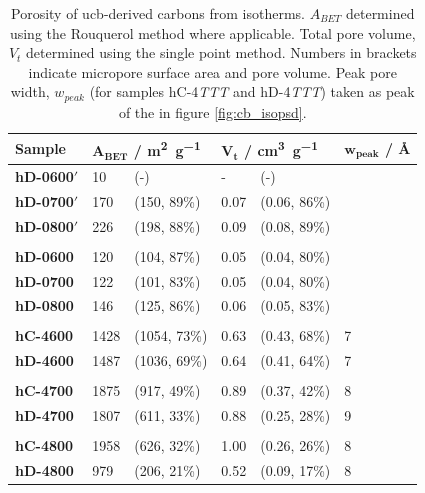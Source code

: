\begin{table}[hb!]
    \centering
    \caption{Porosity of \acrshort{ucb}-derived carbons from  isotherms. $A_{BET}$ determined using the Rouquerol method where applicable. Total pore volume, $V_t$ determined using the single point method. Numbers in brackets indicate micropore surface area and pore volume. Peak pore width, $w_{peak}$ (for samples hC-4\textit{TTT} and hD-4\textit{TTT}) taken as peak of the  in figure \ref{fig:cb_isopsd}.}
    \label{tb:cb_porosity}
    \begin{tabularx}{0.9\textwidth}{lllllll}
    \toprule
        \textbf{Sample} & \multicolumn{2}{l}{$\mathbf{A_{BET}}$ \textbf{/ \unit[detect-weight]{\metre\squared\per\gram}}}  & \multicolumn{2}{l}{$\mathbf{V_t}$ \textbf{/ \unit[detect-weight]{\cm\cubed\per\gram}}} & \multicolumn{2}{l}{$\mathbf{w_{peak}}$ \textbf{/ \unit{\angstrom}}} \\
    \midrule
        \textbf{hD-0600$'$} & 10 & (-) & - & (-) & \\
        \textbf{hD-0700$'$} & 170 & (150, 89\%) & 0.07 & (0.06, 86\%) \\
        \textbf{hD-0800$'$} & 226 & (198, 88\%) & 0.09 & (0.08, 89\%) \\
        & & & \\
        \textbf{hD-0600} & 120 & (104, 87\%) & 0.05 & (0.04, 80\%) & \\
        \textbf{hD-0700} & 122 &  (101, 83\%) & 0.05 & (0.04, 80\%) & \\
        \textbf{hD-0800} & 146 & (125, 86\%) & 0.06 & (0.05, 83\%) \\
        & & & \\
        \textbf{hC-4600} & 1428 & (1054, 73\%) & 0.63 & (0.43, 68\%) & 7  \\
        \textbf{hD-4600} & 1487 & (1036, 69\%) & 0.64 & (0.41, 64\%) & 7 \\
        & & & \\
        \textbf{hC-4700} & 1875 & (917, 49\%) & 0.89 & (0.37, 42\%) & 8 \\
        \textbf{hD-4700} & 1807 & (611, 33\%) & 0.88 & (0.25, 28\%) & 9  \\
        & & & \\
        \textbf{hC-4800} & 1958 & (626, 32\%) & 1.00 & (0.26, 26\%) & 8 \\
        \textbf{hD-4800} & 979 & (206, 21\%) & 0.52 & (0.09, 17\%) &  8 \\
    \bottomrule
    \end{tabularx}
\end{table}


